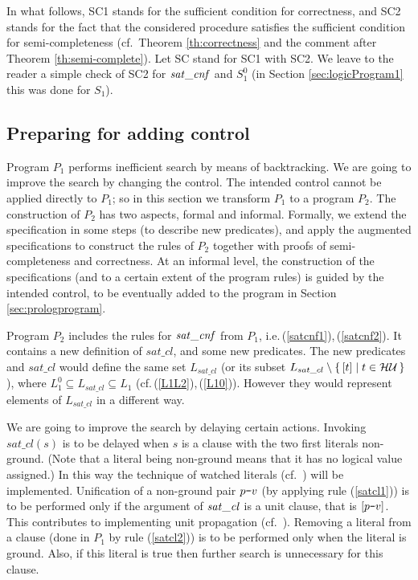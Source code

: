 \documentclass{tlp}
\newcommand*{\mydash}{{\mbox{\tt-}}}
\newcommand*{\HU}{{\ensuremath{\cal{H U}}}\xspace}
\begin{document}
In what follows, SC1 stands for the sufficient condition
for correctness,
and SC2 stands for the fact that the considered procedure satisfies the
sufficient condition for semi-completeness
(cf.\ Theorem \ref{th:correctness} and the comment after
Theorem \ref{th:semi-complete}).
Let SC stand for SC1 with SC2.
We leave to the reader a simple check of SC2 for ${\it sat\_c n f}$
and $S_1^0$ (in Section \ref{sec:logicProgram1} this was done for  $S_1$).



\subsection{Preparing for adding control}
\label{sec:P2}






Program $P_1$ performs inefficient search by means of backtracking.
We are going to improve the search by changing the control.
The intended control cannot be applied directly to $P_1$;
so in this section we transform  $P_1$ to a program $P_2$.
The construction of $P_2$ has two aspects, formal and informal.
Formally, we extend the
specification in some steps (to describe new predicates), and apply the
augmented specifications to construct the rules of $P_2$
together with proofs of semi-completeness and correctness.
At an informal level, the construction of the specifications
(and to a certain extent of the program rules) is guided by the
intended control, to be eventually added to the program in Section
\ref{sec:prologprogram}.  





Program $P_2$ includes the rules for ${\it sat\_c n f}$ from $P_1$,
i.e.\,(\ref{satcnf1}),\,(\ref{satcnf2}).
It contains a new definition of $sat\_cl$, and some new predicates.
The new predicates and $sat\_cl$ would define the same set $L_{sat\_cl}$
(or its subset  $L_{sat\_cl}\setminus \{\, [t]\mid t\in\HU\,\}$),
where $L_1^0 \subseteq L_{sat\_cl} \subseteq L_1$
(cf.\,(\ref{L1L2}),\,(\ref{L10})).
However they would represent elements of  $L_{sat\_cl}$ in a different way.


We are going to improve the search by delaying certain actions.
Invoking  $sat\_cl(s)$ is to be delayed when $s$
is a clause with the two first literals non-ground.
      (Note that a literal being non-ground means that it has no logical
      value assigned.)
In this way the technique of watched literals (cf.\ \cite{handbook-SATsolvers})
will be implemented. 
Unification of a non-ground pair $p\mydash v$ (by applying rule (\ref{satcl1})) 
is to be performed only if the argument of ${\it sat\_cl}$ is a unit clause,
that is $[p\mydash v]$.
This contributes to implementing unit propagation
(cf.\ \cite{handbook-SATsolvers}).
Removing a literal from a clause (done in $P_1$ by rule (\ref{satcl2})) is to
be performed only when the literal is ground.
Also, if this literal is true then further search is unnecessary for this
clause.
\end{document}
